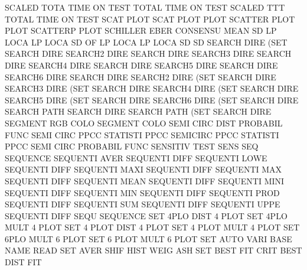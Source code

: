 SCALED   TOTA TIME ON   TEST            TOTAL    TIME ON   TEST
SCALED   TTT                            TOTAL    TIME ON   TEST
SCAT                                    PLOT
SCAT     PLOT                           PLOT
SCATTER  PLOT                           PLOT
SCATTERP                                PLOT
SCHILLER EBER                           CONSENSU MEAN
SD       LP   LOCA                      LP       LOCA
SD       OF   LP   LOCA                 LP       LOCA
SD                                      SD
SEARCH   DIRE (SET                      SEARCH   DIRE
SEARCH2  DIRE                           SEARCH   DIRE
SEARCH3  DIRE                           SEARCH   DIRE
SEARCH4  DIRE                           SEARCH   DIRE
SEARCH5  DIRE                           SEARCH   DIRE
SEARCH6  DIRE                           SEARCH   DIRE
SEARCH2  DIRE (SET                      SEARCH   DIRE
SEARCH3  DIRE (SET                      SEARCH   DIRE
SEARCH4  DIRE (SET                      SEARCH   DIRE
SEARCH5  DIRE (SET                      SEARCH   DIRE
SEARCH6  DIRE (SET                      SEARCH   DIRE
SEARCH   PATH                           SEARCH   DIRE
SEARCH   PATH (SET                      SEARCH   DIRE
SEGMENT  RGB  COLO                      SEGMENT  COLO
SEMI     CIRC DIST                      PROBABIL FUNC
SEMI     CIRC PPCC                      STATISTI PPCC
SEMICIRC PPCC                           STATISTI PPCC
SEMI     CIRC                           PROBABIL FUNC
SENSITIV                                TEST     SENS
SEQ                                     SEQUENCE
SEQUENTI AVER                           SEQUENTI DIFF
SEQUENTI LOWE                           SEQUENTI DIFF
SEQUENTI MAXI                           SEQUENTI DIFF
SEQUENTI MAX                            SEQUENTI DIFF
SEQUENTI MEAN                           SEQUENTI DIFF
SEQUENTI MINI                           SEQUENTI DIFF
SEQUENTI MIN                            SEQUENTI DIFF
SEQUENTI PROD                           SEQUENTI DIFF
SEQUENTI SUM                            SEQUENTI DIFF
SEQUENTI UPPE                           SEQUENTI DIFF
SEQU                                    SEQUENCE
SET      4PLO DIST                      4        PLOT
SET      4PLO MULT                      4        PLOT
SET      4    PLOT DIST                 4        PLOT
SET      4    PLOT MULT                 4        PLOT
SET      6PLO MULT                      6        PLOT
SET      6    PLOT MULT                 6        PLOT
SET      AUTO VARI BASE NAME            READ
SET      AVER SHIF HIST WEIG            ASH
SET      BEST FIT  CRIT                 BEST     DIST FIT
